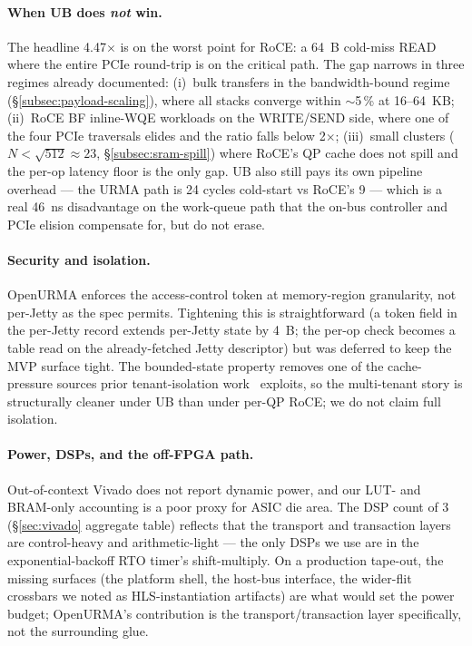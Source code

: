 \documentclass[10pt,twocolumn]{article}
\begin{document}
\paragraph{When UB does \emph{not} win.}
The headline 4.47$\times$ is on the worst point for RoCE: a 64~B
cold-miss READ where the entire PCIe round-trip is on the critical
path. The gap narrows in three regimes already documented:
(i)~bulk transfers in the bandwidth-bound regime
(\S\ref{subsec:payload-scaling}), where all stacks converge within
$\sim$5\,\% at 16--64~KB; (ii)~RoCE BF inline-WQE workloads on the
WRITE/SEND side, where one of the four PCIe traversals elides and
the ratio falls below 2$\times$; (iii)~small clusters
($N{<}\sqrt{512}\approx23$, \S\ref{subsec:sram-spill}) where RoCE's
QP cache does not spill and the per-op latency floor is the only
gap. UB also still pays its own pipeline overhead --- the URMA
path is 24 cycles cold-start vs RoCE's 9 --- which is a real
46~ns disadvantage on the work-queue path that the on-bus
controller and PCIe elision compensate for, but do not erase.

\paragraph{Security and isolation.}
OpenURMA enforces the access-control token at memory-region
granularity, not per-Jetty as the spec permits.
Tightening this is straightforward (a token field in the per-Jetty
record extends per-Jetty state by 4~B; the per-op check becomes a
table read on the already-fetched Jetty descriptor) but was
deferred to keep the MVP surface tight. The bounded-state
property removes one of the cache-pressure sources prior
tenant-isolation work~\cite{kong2023:husky,lou2024:harmonic}
exploits, so the multi-tenant story is structurally cleaner under
UB than under per-QP RoCE; we do not claim full isolation.

\paragraph{Power, DSPs, and the off-FPGA path.}
Out-of-context Vivado does not report dynamic power, and our LUT-
and BRAM-only accounting is a poor proxy for ASIC die area. The
DSP count of 3 (\S\ref{sec:vivado} aggregate table) reflects
that the transport and transaction layers are control-heavy and
arithmetic-light --- the only DSPs we use are in the
exponential-backoff RTO timer's shift-multiply. On a production
tape-out, the missing surfaces (the platform shell, the
host-bus interface, the wider-flit crossbars we noted as
HLS-instantiation artifacts) are what would set the power
budget; OpenURMA's contribution is the transport/transaction
layer specifically, not the surrounding glue.
\end{document}

